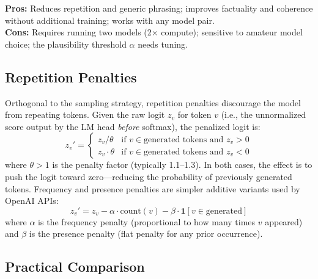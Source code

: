 \textbf{Pros:} Reduces repetition and generic phrasing; improves factuality and coherence without additional training; works with any model pair.\\

\textbf{Cons:} Requires running two models (2$\times$ compute); sensitive to amateur model choice; the plausibility threshold $\alpha$ needs tuning.

\subsection{Repetition Penalties}
\label{repetition-penalties}

Orthogonal to the sampling strategy, repetition penalties discourage the model from repeating tokens. Given the raw logit $z_v$ for token $v$ (i.e., the unnormalized score output by the LM head \emph{before} softmax), the penalized logit is: 
\[
z_v' = \begin{cases}
    z_v / \theta & \text{if } v \in \text{generated tokens and } z_v > 0 \\
    z_v \cdot \theta & \text{if } v \in \text{generated tokens and } z_v < 0
  \end{cases}
\]
 where $\theta > 1$ is the penalty factor (typically 1.1--1.3). In both cases, the effect is to push the logit toward zero---reducing the probability of previously generated tokens. Frequency and presence penalties are simpler additive variants used by OpenAI APIs: 
\[
z_v' = z_v - \alpha \cdot \text{count}(v) - \beta \cdot \mathbf{1}[v \in \text{generated}]
\]
 where $\alpha$ is the frequency penalty (proportional to how many times $v$ appeared) and $\beta$ is the presence penalty (flat penalty for any prior occurrence).

\subsection{Practical Comparison}
\label{practical-comparison}

